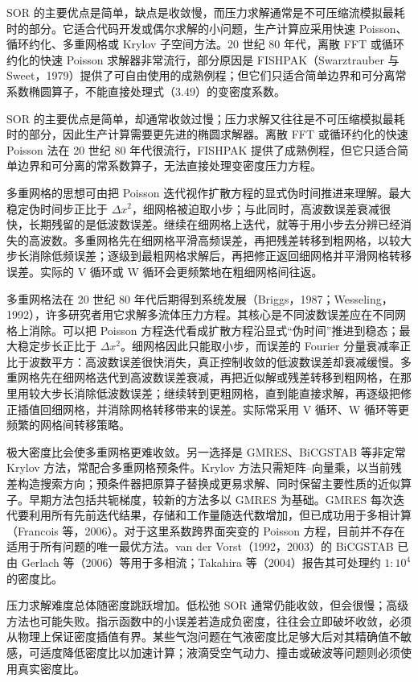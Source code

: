 \documentclass[11pt,a4paper,openany,fontset=none]{ctexbook}
\begin{document}
SOR 的主要优点是简单，缺点是收敛慢，而压力求解通常是不可压缩流模拟最耗时的部分。它适合代码开发或偶尔求解的小问题，生产计算应采用快速 Poisson、循环约化、多重网格或 Krylov 子空间方法。20 世纪 80 年代，离散 FFT 或循环约化的快速 Poisson 求解器非常流行，部分原因是 FISHPAK（Swarztrauber 与 Sweet，1979）提供了可自由使用的成熟例程；但它们只适合简单边界和可分离常系数椭圆算子，不能直接处理式（3.49）的变密度系数。

SOR 的主要优点是简单，却通常收敛过慢；压力求解又往往是不可压缩模拟最耗时的部分，因此生产计算需要更先进的椭圆求解器。离散 FFT 或循环约化的快速 Poisson 法在 20 世纪 80 年代很流行，FISHPAK 提供了成熟例程，但它只适合简单边界和可分离的常系数算子，无法直接处理变密度压力方程。

多重网格的思想可由把 Poisson 迭代视作扩散方程的显式伪时间推进来理解。最大稳定伪时间步正比于 $\Delta x^2$，细网格被迫取小步；与此同时，高波数误差衰减很快，长期残留的是低波数误差。继续在细网格上迭代，就等于用小步去分辨已经消失的高波数。多重网格先在细网格平滑高频误差，再把残差转移到粗网格，以较大步长消除低频误差；逐级到最粗网格求解后，再把修正返回细网格并平滑网格转移误差。实际的 V 循环或 W 循环会更频繁地在粗细网格间往返。

多重网格法在 20 世纪 80 年代后期得到系统发展（Briggs，1987；Wesseling，1992），许多研究者用它求解多流体压力方程。其核心是不同波数误差应在不同网格上消除。可以把 Poisson 方程迭代看成扩散方程沿显式“伪时间”推进到稳态；最大稳定步长正比于 $\Delta x^2$。细网格因此只能取小步，而误差的 Fourier 分量衰减率正比于波数平方：高波数误差很快消失，真正控制收敛的低波数误差却衰减缓慢。多重网格先在细网格迭代到高波数误差衰减，再把近似解或残差转移到粗网格，在那里用较大步长消除低波数误差；继续转到更粗网格，直到能直接求解，再逐级把修正插值回细网格，并消除网格转移带来的误差。实际常采用 V 循环、W 循环等更频繁的网格间转移策略。

极大密度比会使多重网格更难收敛。另一选择是 GMRES、BiCGSTAB 等非定常 Krylov 方法，常配合多重网格预条件。Krylov 方法只需矩阵--向量乘，以当前残差构造搜索方向；预条件器把原算子替换成更易求解、同时保留主要性质的近似算子。早期方法包括共轭梯度，较新的方法多以 GMRES 为基础。GMRES 每次迭代要利用所有先前迭代结果，存储和工作量随迭代数增加，但已成功用于多相计算（Francois 等，2006）。对于这里系数跨界面突变的 Poisson 方程，目前并不存在适用于所有问题的唯一最优方法。van der Vorst（1992，2003）的 BiCGSTAB 已由 Gerlach 等（2006）等用于多相流；Takahira 等（2004）报告其可处理约 $1:10^4$ 的密度比。

压力求解难度总体随密度跳跃增加。低松弛 SOR 通常仍能收敛，但会很慢；高级方法也可能失败。指示函数中的小误差若造成负密度，往往会立即破坏收敛，必须从物理上保证密度插值有界。某些气泡问题在气液密度比足够大后对其精确值不敏感，可适度降低密度比以加速计算；液滴受空气动力、撞击或破波等问题则必须使用真实密度比。
\end{document}
